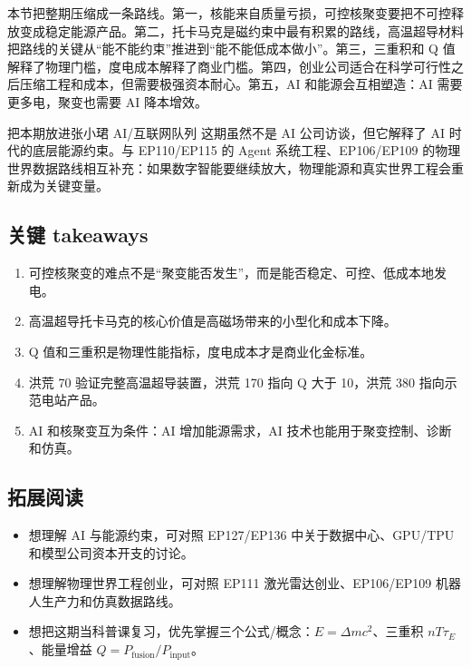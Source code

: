 \documentclass[a4paper]{article}
\begin{document}
本节把整期压缩成一条路线。第一，核能来自质量亏损，可控核聚变要把不可控释放变成稳定能源产品。第二，托卡马克是磁约束中最有积累的路线，高温超导材料把路线的关键从“能不能约束”推进到“能不能低成本做小”。第三，三重积和 Q 值解释了物理门槛，度电成本解释了商业门槛。第四，创业公司适合在科学可行性之后压缩工程和成本，但需要极强资本耐心。第五，AI 和能源会互相塑造：AI 需要更多电，聚变也需要 AI 降本增效。

\begin{importantbox}{把本期放进张小珺 AI/互联网队列}
这期虽然不是 AI 公司访谈，但它解释了 AI 时代的底层能源约束。与 EP110/EP115 的 Agent 系统工程、EP106/EP109 的物理世界数据路线相互补充：如果数字智能要继续放大，物理能源和真实世界工程会重新成为关键变量。
\end{importantbox}

\subsection{关键 takeaways}

\begin{enumerate}
\item 可控核聚变的难点不是“聚变能否发生”，而是能否稳定、可控、低成本地发电。
\item 高温超导托卡马克的核心价值是高磁场带来的小型化和成本下降。
\item Q 值和三重积是物理性能指标，度电成本才是商业化金标准。
\item 洪荒 70 验证完整高温超导装置，洪荒 170 指向 Q 大于 10，洪荒 380 指向示范电站产品。
\item AI 和核聚变互为条件：AI 增加能源需求，AI 技术也能用于聚变控制、诊断和仿真。
\end{enumerate}

\subsection{拓展阅读}

\begin{itemize}
\item 想理解 AI 与能源约束，可对照 EP127/EP136 中关于数据中心、GPU/TPU 和模型公司资本开支的讨论。
\item 想理解物理世界工程创业，可对照 EP111 激光雷达创业、EP106/EP109 机器人生产力和仿真数据路线。
\item 想把这期当科普课复习，优先掌握三个公式/概念：$E=\Delta mc^2$、三重积 $nT\tau_E$、能量增益 $Q=P_{\mathrm{fusion}}/P_{\mathrm{input}}$。
\end{itemize}
\end{document}
